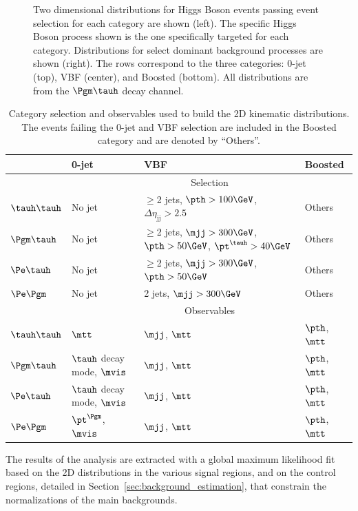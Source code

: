 \begin{figure}[htbp]
     \caption{Two dimensional distributions for Higgs Boson events passing event selection 
for each category are shown (left). The specific Higgs Boson process shown is the one 
specifically targeted for each category. Distributions for select dominant background 
processes are shown (right). The rows correspond to the three categories: 0-jet (top), 
VBF (center), and Boosted (bottom). All distributions are from the $\Pgm\tauh$ decay channel.} 
\end{figure}


\begin{table}
\centering
\begin{small}
\begin{tabular}{llll}
 & 0-jet & VBF & Boosted \\
\hline
 & \multicolumn{3}{c}{Selection} \\ \cline{2-4}
$\tauh\tauh$ & No jet &  \scriptsize{$\geq$2 jets, $\pth>100\GeV$, $\Delta\eta_{\mathrm{jj}}>2.5$} & Others\\
$\Pgm\tauh$ & No jet &  \scriptsize{$\geq$2 jets, $\mjj>300\GeV$, $\pth>50\GeV$, $\pt^{\tauh}>40\GeV$} & Others\\
$\Pe\tauh$ & No jet &  \scriptsize{$\geq$2 jets, $\mjj>300\GeV$, $\pth>50\GeV$} & Others\\
$\Pe\Pgm$ & No jet & \scriptsize{2 jets, $\mjj>300\GeV$} & Others \\
\hline
 & \multicolumn{3}{c}{Observables}\\ \cline{2-4}
$\tauh\tauh$ & $\mtt$                 &    $\mjj$, $\mtt$  &   $\pth$, $\mtt$  \\
$\Pgm\tauh$ & $\tauh$ decay mode, $\mvis$   &    $\mjj$, $\mtt$  &  $\pth$, $\mtt$  \\
$\Pe\tauh$ & $\tauh$ decay mode, $\mvis$   &    $\mjj$, $\mtt$  &  $\pth$, $\mtt$ \\
$\Pe\Pgm$ & $\pt^{\Pgm}$, $\mvis$   &     $\mjj$, $\mtt$  &   $\pth$, $\mtt$  \\
\hline
\end{tabular}
\caption{ Category selection and observables used to build the 2D kinematic distributions. 
The events failing the 0-jet and VBF selection are included in the Boosted category and are
denoted by ``Others''.
\label{tab:htt_categories}
}
\end{small}
\end{table}

The results of the analysis are extracted with a global maximum likelihood fit based on the 
2D distributions in the various signal regions, and on the control regions, detailed in 
Section~\ref{sec:background_estimation}, that constrain the normalizations of the main backgrounds.

